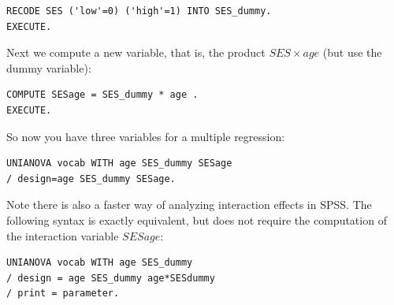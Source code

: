 \documentclass[]{report}\usepackage[]{graphicx}\usepackage[]{color}
\begin{document}
\begin{verbatim}
RECODE SES ('low'=0) ('high'=1) INTO SES_dummy.
EXECUTE.
\end{verbatim}

Next we compute a new variable, that is, the product $SES \times age$ (but use the dummy variable):


\begin{verbatim}
COMPUTE SESage = SES_dummy * age .
EXECUTE.
\end{verbatim}

So now you have three variables for a multiple regression:

\begin{verbatim}
UNIANOVA vocab WITH age SES_dummy SESage
/ design=age SES_dummy SESage.
\end{verbatim}


Note there is also a faster way of analyzing interaction effects in SPSS. The following syntax is exactly equivalent, but does not require the computation of the interaction variable $SESage$:

\begin{verbatim}
UNIANOVA vocab WITH age SES_dummy 
/ design = age SES_dummy age*SESdummy
/ print = parameter.
\end{verbatim}
\end{document}
